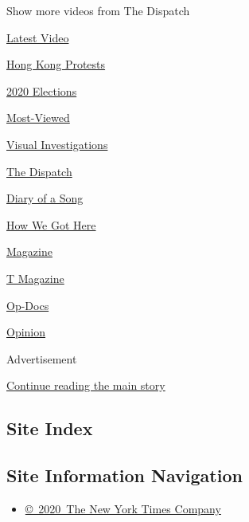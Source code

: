 Show more videos from The Dispatch

\href{/video}{}

\href{/video/latest-video}{Latest Video}

\href{/video/hk-protest}{Hong Kong Protests}

\href{/video/2020-Elections}{2020 Elections}

\href{/video/Most-Viewed}{Most-Viewed}

\href{/video/investigations}{Visual Investigations}

\href{/video/on-the-ground}{The Dispatch}

\href{/video/diaryofasong}{Diary of a Song}

\href{/video/how-we-got-here}{How We Got Here}

\href{/video/magazine}{Magazine}

\href{/video/t-magazine}{T Magazine}

\href{/video/op-docs}{Op-Docs}

\href{/video/opinion}{Opinion}

Advertisement

\protect\hyperlink{after-bottom}{Continue reading the main story}

\hypertarget{site-index}{%
\subsection{Site Index}\label{site-index}}

\hypertarget{site-information-navigation}{%
\subsection{Site Information
Navigation}\label{site-information-navigation}}

\begin{itemize}
\tightlist
\item
  \href{https://help.nytimes.com/hc/en-us/articles/115014792127-Copyright-notice}{©~2020~The
  New York Times Company}
\end{itemize}

